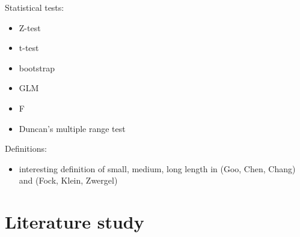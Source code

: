 \documentclass[
  12pt,
  a4paper,
  oneside]{book}
\providecommand{\tightlist}{%
  \setlength{\itemsep}{0pt}\setlength{\parskip}{0pt}}
\begin{document}
Statistical tests:

\begin{itemize}
\item
  Z-test
\item
  t-test
\item
  bootstrap
\item
  GLM
\item
  F
\item
  Duncan's multiple range test
\end{itemize}

Definitions:

\begin{itemize}
\tightlist
\item
  interesting definition of small, medium, long length in (Goo, Chen, Chang) and (Fock, Klein, Zwergel)
\end{itemize}

\chapter{Literature study}\label{literature-study}

  
\end{document}
